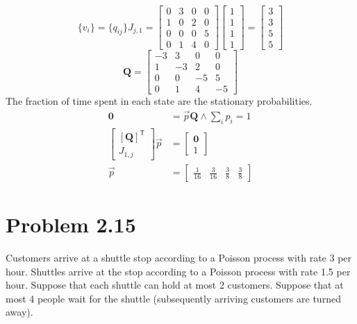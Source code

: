 \documentclass[letterpaper]{amsart}
\begin{document}
\begin{equation*}
  \{v_i\}=
  \{q_{ij}\}J_{j,1} =
\begin{bmatrix}
  0 & 3 & 0 & 0 \\
  1 & 0 & 2 & 0 \\
  0 & 0 & 0 & 5 \\
  0 & 1 & 4 & 0
\end{bmatrix}
\begin{bmatrix}
  1 \\ 1 \\ 1 \\ 1
\end{bmatrix}
=
\begin{bmatrix}
  3 \\ 3 \\ 5 \\ 5
\end{bmatrix}
\end{equation*}
\begin{equation*}
\mathbf{Q}=
\begin{bmatrix}
  -3 & 3 & 0 & 0 \\
  1 & -3 & 2 & 0 \\
  0 & 0 & -5 & 5 \\
  0 & 1 & 4 & -5
\end{bmatrix}
\end{equation*}
The fraction of time spent in each state are the stationary probabilities.
\begin{align*}
  \mathbf{0} &=\vec{p}\mathbf{Q}
               \land
  \sum_ip_i=1\\
\begin{bmatrix}
  \left[\mathbf{Q}\right]^\mathsf{T} \\
  J_{1,j}
\end{bmatrix}
  \vec{p} &=
              \begin{bmatrix}
                \mathbf{0} \\
                1
              \end{bmatrix}
  \\
  \vec{p} &=
\begin{bmatrix}
  \frac{1}{16} &
  \frac{3}{16} &
  \frac{3}{8} &
  \frac{3}{8}
\end{bmatrix}
\end{align*}

\section{Problem 2.15} %
Customers arrive at a shuttle stop according to a Poisson process with rate 3
per hour. Shuttles arrive at the stop according to a Poisson process with
rate 1.5 per hour. Suppose that each shuttle can hold at most 2 customers.
Suppose that at most 4 people wait for the shuttle (subsequently arriving
customers are turned away).
\end{document}
